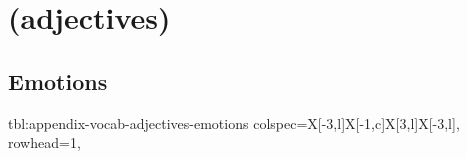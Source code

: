 \documentclass[../nihongo-gakushuu-kyouzai-vocabulary.tex]{subfiles}
\begin{document}
\appendix
\setcounter{section}{2}

\section{ (adjectives)}


\subsection{Emotions}
{tbl:appendix-vocab-adjectives-emotions}  %
{}  %
{
    colspec={X[-3,l]X[-1,c]X[3,l]X[-3,l]},
    rowhead=1,
}  %
\end{document}
